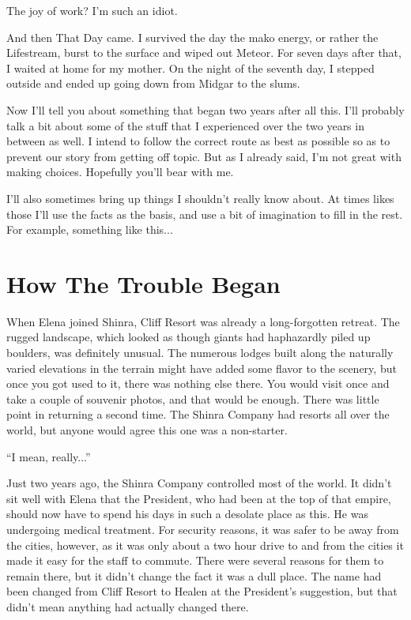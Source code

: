 \documentclass[oneside]{book}
\begin{document}
The joy of work? I’m such an idiot.

And then That Day came. I survived the day the mako energy, or rather the Lifestream, burst to the surface and wiped out Meteor. For seven days after that, I waited at home for my mother. On the night of the seventh day, I stepped outside and ended up going down from Midgar to the slums.

Now I’ll tell you about something that began two years after all this. I’ll probably talk a bit about some of the stuff that I experienced over the two years in between as well. I intend to follow the correct route as best as possible so as to prevent our story from getting off topic. But as I already said, I’m not great with making choices. Hopefully you’ll bear with me.

I’ll also sometimes bring up things I shouldn’t really know about. At times likes those I’ll use the facts as the basis, and use a bit of imagination to fill in the rest. For example, something like this...

\chapter{How The Trouble Began}
When Elena joined Shinra, Cliff Resort was already a long-forgotten retreat. The rugged landscape, which looked as though giants had haphazardly piled up boulders, was definitely unusual. The numerous lodges built along the naturally varied elevations in the terrain might have added some flavor to the scenery, but once you got used to it, there was nothing else there. You would visit once and take a couple of souvenir photos, and that would be enough. There was little point in returning a second time. The Shinra Company had resorts all over the world, but anyone would agree this one was a non-starter.

“I mean, really...”

Just two years ago, the Shinra Company controlled most of the world. It didn’t sit well with Elena that the President, who had been at the top of that empire, should now have to spend his days in such a desolate place as this. He was undergoing medical treatment. For security reasons, it was safer to be away from the cities, however, as it was only about a two hour drive to and from the cities it made it easy for the staff to commute. There were several reasons for them to remain there, but it didn’t change the fact it was a dull place. The name had been changed from Cliff Resort to Healen at the President’s suggestion, but that didn’t mean anything had actually changed there.
\end{document}
